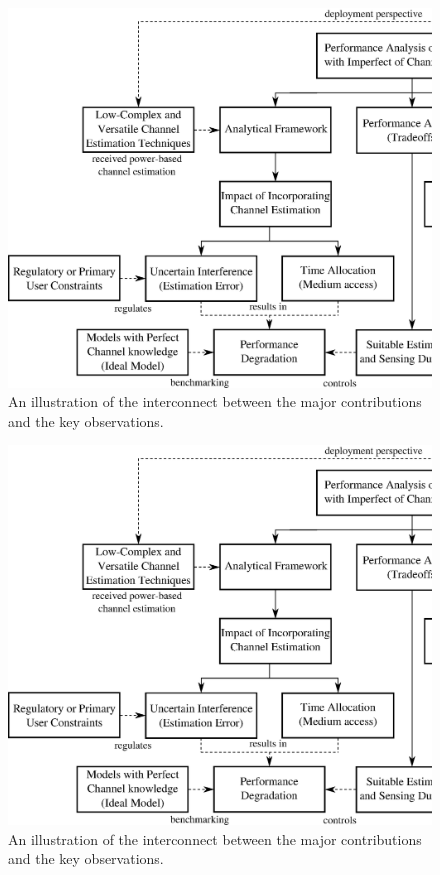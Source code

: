 \ifdebug
\begin{figure}
        \centering
        \includegraphics[width=\textheight]{figures/Contri}
        \caption{An illustration of the interconnect between the major contributions and the key observations.}
        \label{fig:contri}
\end{figure}
\else
\begin{figure}
        \centering
        \includegraphics[width=\textheight]{figures/Contri}
        \caption{An illustration of the interconnect between the major contributions and the key observations.}
        \label{fig:contri}
\end{figure}
\fi

